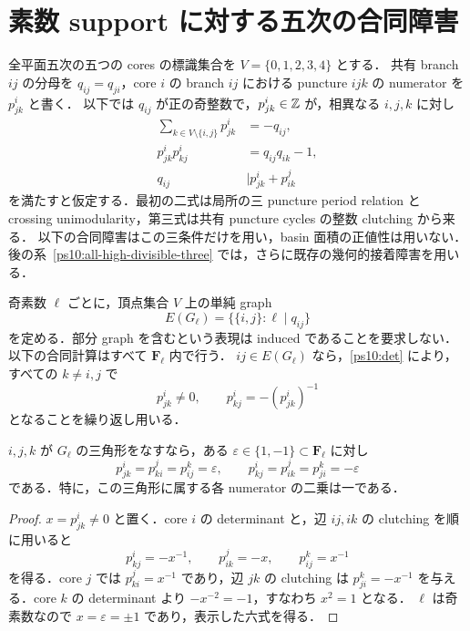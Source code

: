 
\section{素数 support に対する五次の合同障害}
\label{ps10:section}

全平面五次の五つの cores の標識集合を $V=\{0,1,2,3,4\}$ とする．
共有 branch $ij$ の分母を $q_{ij}=q_{ji}$，core $i$ の branch $ij$ における
puncture $ijk$ の numerator を $p^i_{jk}$ と書く．
以下では $q_{ij}$ が正の奇整数で，$p^i_{jk}\in\mathbb Z$ が，相異なる $i,j,k$ に対し
\begin{align}
 \sum_{k\in V\setminus\{i,j\}}p^i_{jk}&=-q_{ij},
       \label{ps10:row}\\
 p^i_{jk}p^i_{kj}&=q_{ij}q_{ik}-1,
       \label{ps10:det}\\
 q_{ij}&\mid p^i_{jk}+p^j_{ik}
       \label{ps10:clutch}
\end{align}
を満たすと仮定する．最初の二式は局所の三 puncture period relation と
crossing unimodularity，第三式は共有 puncture cycles の整数 clutching から来る．
以下の合同障害はこの三条件だけを用い，basin 面積の正値性は用いない．
後の系~\ref{ps10:all-high-divisible-three} では，さらに既存の幾何的接着障害を用いる．

奇素数 $\ell$ ごとに，頂点集合 $V$ 上の単純 graph
\[
 E(G_\ell)=\bigl\{\{i,j\}:\ell\mid q_{ij}\bigr\}
\]
を定める．部分 graph を含むという表現は induced であることを要求しない．
以下の合同計算はすべて $\mathbf F_\ell$ 内で行う．
$ij\in E(G_\ell)$ なら，\eqref{ps10:det} により，すべての $k\ne i,j$ で
\begin{equation}\label{ps10:unit}
 p^i_{jk}\ne0,
 \qquad p^i_{kj}=-(p^i_{jk})^{-1}
\end{equation}
となることを繰り返し用いる．

\begin{lemma}[三角形の符号]\label{ps10:triangle}
$i,j,k$ が $G_\ell$ の三角形をなすなら，ある
$\varepsilon\in\{1,-1\}\subset\mathbf F_\ell$ に対し
\[
 p^i_{jk}=p^j_{ki}=p^k_{ij}=\varepsilon,
 \qquad
 p^i_{kj}=p^j_{ik}=p^k_{ji}=-\varepsilon
\]
である．特に，この三角形に属する各 numerator の二乗は一である．
\end{lemma}

\begin{proof}
$x=p^i_{jk}\ne0$ と置く．core $i$ の determinant と，辺 $ij,ik$ の
clutching を順に用いると
\[
 p^i_{kj}=-x^{-1},\qquad p^j_{ik}=-x,\qquad p^k_{ij}=x^{-1}
\]
を得る．core $j$ では $p^j_{ki}=x^{-1}$ であり，辺 $jk$ の clutching は
$p^k_{ji}=-x^{-1}$ を与える．core $k$ の determinant より
$-x^{-2}=-1$，すなわち $x^2=1$ となる．
$\ell$ は奇素数なので $x=\varepsilon=\pm1$ であり，表示した六式を得る．
\end{proof}

